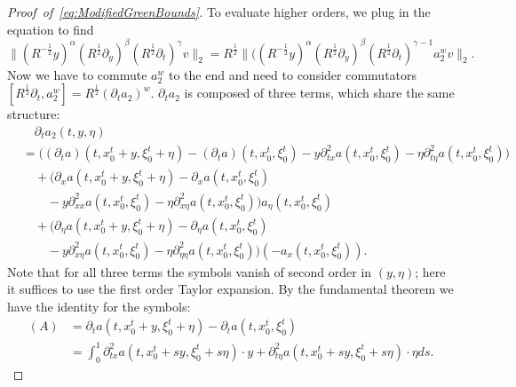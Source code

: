 \documentclass{amsart}
\theoremstyle{definition}
\begin{document}
\begin{proof}[Proof~of~\eqref{eq:ModifiedGreenBounds}]
To evaluate higher orders, we plug in the equation to find
\begin{equation}
\label{eq:HigherOrderSimplification}
\| (R^{-\frac{1}{2}} y)^{\alpha} (R^{\frac{1}{2}} \partial_y)^{\beta} (R^{\frac{1}{2}} \partial_t)^{\gamma} v \|_2 = R^{\frac{1}{2}} \| ((R^{-\frac{1}{2}} y)^{\alpha} (R^{\frac{1}{2}} \partial_y)^{\beta} (R^{\frac{1}{2}} \partial_t)^{\gamma-1} a_2^w v \|_2.
\end{equation}
Now we have to commute $a_2^w$ to the end and need to consider commutators \\ $[R^{\frac{1}{2}} \partial_t, a_2^w] = R^{\frac{1}{2}} (\partial_t a_2)^w$. $\partial_t a_2$ is composed of three terms, which share the same structure:
\begin{equation}
\label{eq:TimeDerivativea2Expansion}
\begin{split}
&\quad \partial_t a_2(t,y,\eta) \\
&= \big( (\partial_t a)(t,x_0^t+y,\xi_0^t + \eta) - (\partial_t a)(t,x_0^t,\xi_0^t) - y \partial^2_{tx} a(t,x_0^t, \xi_0^t) - \eta \partial^2_{t \eta} a(t,x_0^t,\xi_0^t) \big) \\
&\quad + \big( \partial_x a(t,x_0^t+y, \xi_0^t + \eta) - \partial_x a(t,x_0^t, \xi_0^t) \\
&\quad \quad - y \partial^2_{xx} a(t,x_0^t,\xi_0^t) - \eta \partial^2_{x \eta} a(t,x_0^t,\xi_0^t) \big) a_{\eta}(t,x_0^t,\xi_0^t) \\
&\quad + \big( \partial_{\eta} a(t,x_0^t+y,\xi_0^t+\eta) - \partial_{\eta} a(t,x_0^t,\xi_0^t) \\
&\quad \quad - y \partial^2_{x \eta} a(t,x_0^t,\xi_0^t) - \eta \partial^2_{\eta \eta} a(t,x_0^t,\xi_0^t) \big) (- a_x(t,x_0^t,\xi_0^t)).
\end{split}
\end{equation}
Note that for all three terms the symbols vanish of second order in $(y,\eta)$; here it suffices to use the first order Taylor expansion.
By the fundamental theorem we have the identity for the symbols:
\begin{equation*}
\begin{split}
(A) &= \partial_t a(t,x_0^t+y, \xi_0^t + \eta) - \partial_t a(t,x_0^t, \xi_0^t) \\
&= \int_0^1 \partial^2_{tx} a(t,x_0^t+sy,\xi_0^t + s \eta) \cdot y + \partial^2_{t \eta} a(t,x_0^t+sy,\xi_0^t+s \eta) \cdot \eta ds.
\end{split}
\end{equation*}


\end{proof}
\end{document}
